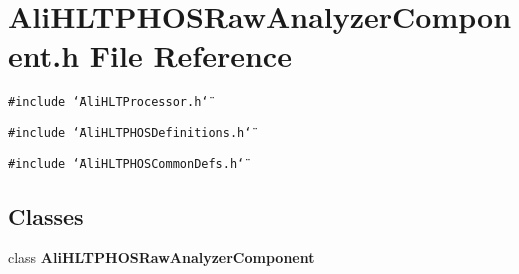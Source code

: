 \section{Ali\-HLTPHOSRaw\-Analyzer\-Component.h File Reference}
\label{AliHLTPHOSRawAnalyzerComponent_8h}


{\tt \#include \char`\"{}Ali\-HLTProcessor.h\char`\"{}}\par
{\tt \#include \char`\"{}Ali\-HLTPHOSDefinitions.h\char`\"{}}\par
{\tt \#include \char`\"{}Ali\-HLTPHOSCommon\-Defs.h\char`\"{}}\par
\subsection*{Classes}
\begin{CompactItemize}
\item 
class {\bf Ali\-HLTPHOSRaw\-Analyzer\-Component}
\end{CompactItemize}
